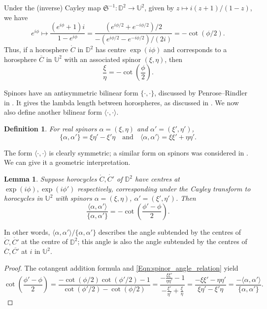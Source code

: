 \documentclass[12pt]{amsart}
\numberwithin{equation}{section}
\newtheorem{lem}[equation]{Lemma}
\newtheorem{definition}[equation]{Definition}
\theoremstyle{named}
\newcommand{\refeqn}[1]{\eqref{Eqn:#1}}
\newcommand{\To}{\longrightarrow}
\begin{document}
Under the (inverse) Cayley map $\mathfrak{S}^{-1} \colon \mathbb{D}^2 \To \mathbb{U}^2$, given by $z \mapsto i(z+1)/(1-z)$, we have
\[
e^{i\phi} \mapsto \frac{(e^{i\phi}+1)i}{1-e^{i\phi}} 
= \frac{ \left( e^{i\phi/2} + e^{-i\phi/2} \right) /2 }{ - \left( e^{i\phi/2}-e^{-i\phi/2} \right) / (2i) }
= -\cot(\phi/2).
\]
Thus, if a horosphere $\mathring{C}$ in $\mathbb{D}^2$ has centre $\exp(i \phi)$ and corresponds to a horosphere $\overline{C}$ in $\mathbb{U}^2$ with an associated spinor $(\xi, \eta)$, then
\begin{equation}
\label{Eqn:spinor_angle_relation}
\frac{\xi}{\eta} = - \cot \left( \frac{\phi}{2} \right).
\end{equation}

Spinors have an antisymmetric bilinear form $\{ \cdot, \cdot \}$, discussed by Penrose--Rindler in \cite{Penrose_Rindler84}. It gives the lambda length between horospheres, as discussed in \cite{M_spinors_horospheres}. We now also define another bilinear form $\langle \cdot, \cdot \rangle$.
\begin{definition}
For real spinors $\alpha = (\xi, \eta)$ and $\alpha' = (\xi', \eta')$,
\[
\{\alpha, \alpha'\} = \xi \eta' - \xi' \eta
\quad \text{and} \quad
\langle \alpha, \alpha' \rangle = \xi \xi' + \eta \eta'.
\]
\end{definition}
The form $\langle \cdot, \cdot \rangle$ is clearly symmetric; a similar form on spinors was considered in \cite{M_Varsha_quaternionic}. We can give it a geometric interpretation.
\begin{lem}
\label{Lem:angle_from_inner_product}
Suppose horocycles $\mathring{C}, \mathring{C'}$ of $\mathbb{D}^2$ have centres at $\exp(i\phi), \exp(i\phi')$ respectively, corresponding under the Cayley transform to horocycles in $\mathbb{U}^2$ with spinors $\alpha = (\xi, \eta)$, $\alpha' = (\xi', \eta')$. Then
\[
\frac{\langle \alpha, \alpha' \rangle}{ \{ \alpha, \alpha' \} } = -\cot \left( \frac{\phi' - \phi}{2} \right).
\]
\end{lem}
In other words, $\langle \alpha, \alpha' \rangle/\{\alpha, \alpha'\}$ describes the angle subtended by the centres of $\mathring{C}, \mathring{C'}$ at the centre of $\mathbb{D}^2$; this angle is also the angle subtended by the centres of $\overline{C}, \overline{C'}$ at $i$ in $\mathbb{U}^2$.
\begin{proof}
The cotangent addition formula and \refeqn{spinor_angle_relation} yield
\[
\cot \left( \frac{\phi' - \phi}{2} \right)
= \frac{ -\cot (\phi/2) \cot (\phi'/2) -1 }{\cot (\phi'/2) - \cot (\phi/2) }
= \frac{ - \frac{\xi \xi'}{\eta \eta'} - 1}{- \frac{\xi'}{\eta'} + \frac{\xi}{\eta} }
= \frac{-\xi \xi' - \eta \eta'}{\xi \eta' - \xi' \eta}
= \frac{-\langle \alpha, \alpha' \rangle}{ \{ \alpha, \alpha' \} }.
\]
\end{proof}
\end{document}
